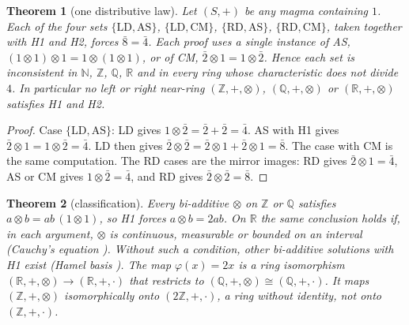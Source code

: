 \documentclass[11pt]{article}
\newtheorem{theorem}{Theorem}
\theoremstyle{remark}
\begin{document}
\begin{theorem}[one distributive law]\label{thm:one}
Let $(S,+)$ be any magma containing $1$. Each of the four sets $\{\mathrm{LD},\mathrm{AS}\}$, $\{\mathrm{LD},\mathrm{CM}\}$, $\{\mathrm{RD},\mathrm{AS}\}$, $\{\mathrm{RD},\mathrm{CM}\}$, taken together with H1 and H2, forces $\bar8=\bar4$. Each proof uses a single instance of AS, $(1\otimes1)\otimes1=1\otimes(1\otimes1)$, or of CM, $\bar2\otimes1=1\otimes\bar2$. Hence each set is inconsistent in $\mathbb N$, $\mathbb Z$, $\mathbb Q$, $\mathbb R$ and in every ring whose characteristic does not divide $4$. In particular no left or right near-ring \cite{Pilz} $(\mathbb Z,+,\otimes)$, $(\mathbb Q,+,\otimes)$ or $(\mathbb R,+,\otimes)$ satisfies H1 and H2.
\end{theorem}
\begin{proof}
Case $\{\mathrm{LD},\mathrm{AS}\}$: LD gives $1\otimes\bar2=\bar2+\bar2=\bar4$. AS with H1 gives $\bar2\otimes1=1\otimes\bar2=\bar4$. LD then gives $\bar2\otimes\bar2=\bar2\otimes1+\bar2\otimes1=\bar8$. The case with CM is the same computation. The RD cases are the mirror images: RD gives $\bar2\otimes1=\bar4$, AS or CM gives $1\otimes\bar2=\bar4$, and RD gives $\bar2\otimes\bar2=\bar8$.
\end{proof}

\begin{theorem}[classification]\label{thm:class}
Every bi-additive $\otimes$ on $\mathbb Z$ or $\mathbb Q$ satisfies $a\otimes b=ab\,(1\otimes1)$, so H1 forces $a\otimes b=2ab$. On $\mathbb R$ the same conclusion holds if, in each argument, $\otimes$ is continuous, measurable or bounded on an interval (Cauchy's equation \cite{Aczel}). Without such a condition, other bi-additive solutions with H1 exist (Hamel basis \cite{Hamel}). The map $\varphi(x)=2x$ is a ring isomorphism $(\mathbb R,+,\otimes)\to(\mathbb R,+,\cdot)$ that restricts to $(\mathbb Q,+,\otimes)\cong(\mathbb Q,+,\cdot)$. It maps $(\mathbb Z,+,\otimes)$ isomorphically onto $(2\mathbb Z,+,\cdot)$, a ring without identity, not onto $(\mathbb Z,+,\cdot)$.
\end{theorem}
\end{document}
